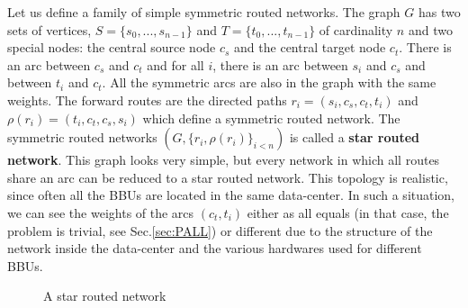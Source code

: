 \documentclass[10pt, conference, letterpaper]{IEEEtran}
\begin{document}
      Let us define a family of simple symmetric routed networks. 
      The graph $G$ has two sets of vertices, $S=\{s_0,...,s_{n-1}\}$ and $T=\{t_0,...,t_{n-1}\}$ of cardinality $n$ and two special nodes:
      the central source node {\bf $c_s$} and the central target node {\bf $c_t$}.
      There is an arc between {\bf $c_s$} and {\bf $c_t$} and for all $i$, there is an arc between $s_i$ and $c_s$ and between $t_i$ and $c_t$.
      All the symmetric arcs are also in the graph with the same weights.
      The forward routes are the directed paths $r_i = (s_i,c_s,c_t,t_i)$ and $\rho(r_i) = (t_i,c_t,c_s,s_i)$ which define a symmetric routed network. 
      The symmetric routed networks $(G, \{r_i,\rho(r_i)\}_{i<n})$ is called a \textbf{star routed network}. This graph looks very simple, but every network in which all routes share an arc can be reduced to a star routed network. This topology is realistic, since often all the BBUs are located in the same data-center. In such a situation, we can see the weights of the arcs $(c_t,t_i)$ either as all equals (in that case, the problem is trivial, see Sec.\ref{sec:PALL}) or different due to the structure of the network inside the data-center and the various hardwares used for different BBUs. 
      \begin{figure}
       \begin{center}

  \end{center}
  \caption{A star routed network}
  \end{figure}
	
\end{document}
